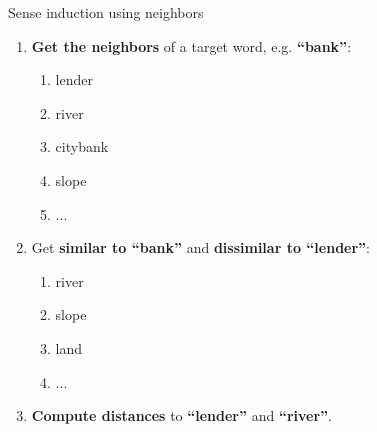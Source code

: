 \begin{frame}{ Sense induction using neighbors }

\begin{enumerate}
	\item \textbf{Get the neighbors} of a target word, e.g. \textbf{``bank''}:
	\begin{enumerate}
	\item \alert{lender}
	\item \textcolor{Cerulean}{river}
	\item \alert{citybank}
	\item \textcolor{Cerulean}{slope}
	\item ...
	\end{enumerate}
	
	\item Get \textbf{similar to ``bank''} and \textbf{dissimilar to \alert{``lender''}}:
	
	\begin{enumerate}
	\item \textcolor{Cerulean}{river}
	\item \textcolor{Cerulean}{slope}
	\item \textcolor{Cerulean}{land}
	\item ...
	\end{enumerate}
	 
\item \textbf{Compute distances} to \alert{\textbf{``lender''}} and \textcolor{Cerulean}{\textbf{``river''}}.
\end{enumerate}

\end{frame}





